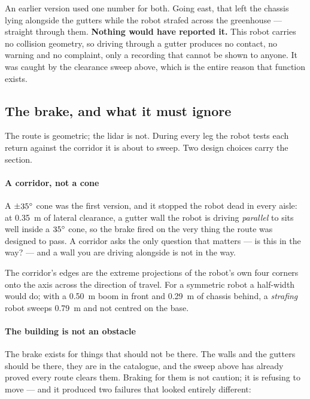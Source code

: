 An earlier version used one number for both. Going east, that left the
chassis lying alongside the gutters while the robot strafed across the
greenhouse --- straight through them. \textbf{Nothing would have
reported it.} This robot carries no collision geometry, so driving
through a gutter produces no contact, no warning and no complaint, only
a recording that cannot be shown to anyone. It was caught by the
clearance sweep above, which is the entire reason that function exists.

\subsection{The brake, and what it must ignore}

The route is geometric; the lidar is not. During every leg the robot
tests each return against the corridor it is about to sweep. Two design
choices carry the section.

\paragraph{A corridor, not a cone} A $\pm35^\circ$ cone was the first
version, and it stopped the robot dead in every aisle: at \SI{0.35}{m}
of lateral clearance, a gutter wall the robot is driving \emph{parallel}
to sits well inside a $35^\circ$ cone, so the brake fired on the very
thing the route was designed to pass. A corridor asks the only question
that matters --- is this in the way? --- and a wall you are driving
alongside is not in the way.

The corridor's edges are the extreme projections of the robot's own four
corners onto the axis across the direction of travel. For a symmetric
robot a half-width would do; with a \SI{0.50}{m} boom in front and
\SI{0.29}{m} of chassis behind, a \emph{strafing} robot sweeps
\SI{0.79}{m} and not centred on the base.

\paragraph{The building is not an obstacle} The brake exists for things
that should not be there. The walls and the gutters should be there,
they are in the catalogue, and the sweep above has already proved every
route clears them. Braking for them is not caution; it is refusing to
move --- and it produced two failures that looked entirely different:

